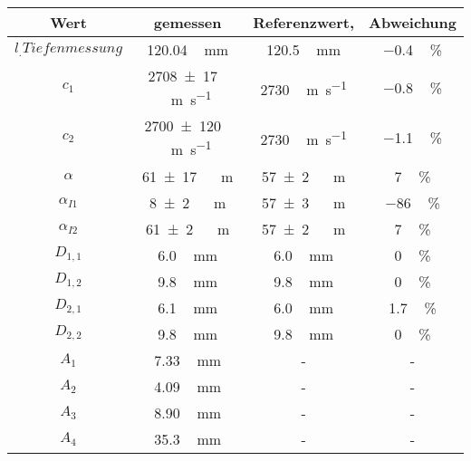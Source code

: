 \label{tab:Ergebnisse}
	\begin{tabular}{c ccc}
		\toprule
		{Wert}&{gemessen}&{Referenzwert\cite{cAcryl},\cite{alphaAcryl}}&{Abweichung} \\
		\midrule
		$l_.{Tiefenmessung}$ & \SI{120.04}\,\si{\milli\meter} & \SI{120.5}\,\si{\milli\meter} & \SI{-0.4}\,\si{\percent} \\
		$c_\text{1}$ & \SI{2708\pm17}\,\si{\meter\per\second} & \SI{2730}\,\si{\meter\per\second} & \SI{-0.8}\,\si{\percent} \\
		$c_\text{2}$ & \SI{2700\pm120}\,\si{\meter\per\second} & \SI{2730}\,\si{\meter\per\second} & \SI{-1.1}\,\si{\percent} \\
		$\alpha$ & \SI{61\pm17}\,\si{\per\meter} & \SI{57\pm2}\,\si{\per\meter} & \SI{7}\,\si{\percent} \\
		$\alpha_{I1}$ & \SI{8\pm2}\,\si{\per\meter} & \SI{57\pm3}\,\si{\per\meter} & \SI{-86}\,\si{\percent} \\
		$\alpha_{I2}$ & \SI{61\pm2}\,\si{\per\meter} & \SI{57\pm2}\,\si{\per\meter} & \SI{7}\,\si{\percent} \\
		$D_{1,1}$ & \SI{6.0}\,\si{\milli\meter} & \SI{6.0}\,\si{\milli\meter} & \SI{0}\,\si{\percent} \\
		$D_{1,2}$ & \SI{9.8}\,\si{\milli\meter} & \SI{9.8}\,\si{\milli\meter} & \SI{0}\,\si{\percent} \\
		$D_{2,1}$ & \SI{6.1}\,\si{\milli\meter} & \SI{6.0}\,\si{\milli\meter} & \SI{1.7}\,\si{\percent} \\
		$D_{2,2}$ & \SI{9.8}\,\si{\milli\meter} & \SI{9.8}\,\si{\milli\meter} & \SI{0}\,\si{\percent} \\
		$A_1$ & \SI{7.33}\,\si{\milli\meter} & - & - \\
		$A_2$ & \SI{4.09}\,\si{\milli\meter} & - & - \\
		$A_3$ & \SI{8.90}\,\si{\milli\meter} & - & - \\
		$A_4$ & \SI{35.3}\,\si{\milli\meter} & - & - \\
		\bottomrule
	\end{tabular}
